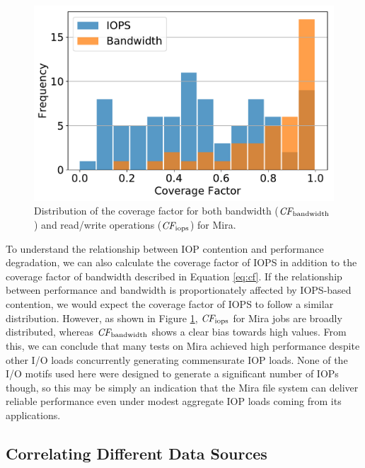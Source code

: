 \documentclass[conference,10pt,compsocconf]{IEEEtran}
\begin{document}
\begin{figure}[t]
	\centering
	\includegraphics[width=\columnwidth]{figs/hist-cf-bw-and-ops.pdf}
	\caption{Distribution  of the coverage factor for both bandwidth ($\textit{CF}_{\textup{bandwidth}}$) and read/write operations ($\textit{CF}_{\textup{iops}}$) for Mira.
    }
	\label{fig:hist-cf-mira}
\end{figure}

To understand the relationship between IOP contention and performance degradation, we can also calculate the coverage factor of IOPS in addition to the coverage factor of bandwidth described in Equation \ref{eq:cf}.  If the relationship between performance and bandwidth is proportionately affected by IOPS-based contention, we would expect the coverage factor of IOPS to follow a similar distribution.  However, as shown in Figure \ref{fig:hist-cf-mira}, $\textit{CF}_{\textup{iops}}$ for Mira jobs are broadly distributed, whereas $\textit{CF}_{\textup{bandwidth}}$ shows a clear bias towards high values.  From this, we can conclude that many tests on Mira achieved high performance despite other I/O loads concurrently generating commensurate IOP loads.  None of the I/O motifs used here were designed to generate a significant number of IOPs though, so this may be simply an indication that the Mira file system can deliver reliable performance even under modest aggregate IOP loads coming from its applications.

\subsection{Correlating Different Data Sources} \label{sec:results/correlating}
\end{document}
